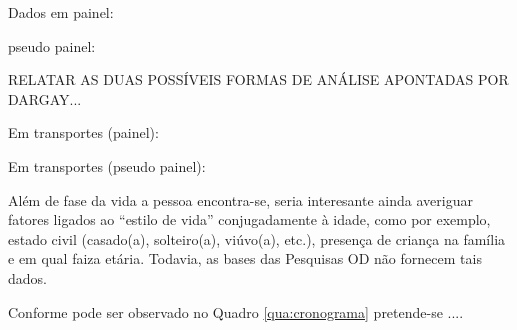 

Dados em painel: \cite{DEATON1985,VERBEEK1992,VERBEEK1992,WOOLDRIDGE2002,FAVERO2013}

pseudo painel: \cite{WARUNSIRI2010,MENG2014,NETTO2014,NETTO2014a}

RELATAR AS DUAS POSSÍVEIS FORMAS DE ANÁLISE APONTADAS POR DARGAY...

Em transportes (painel): \cite{HANSON1985,MOFFITT1993,WIZEMAN2001,LANZENDORF2005,THOGERSEN2006,TRB2006,GLAESER2008,DIANA2010,SENER2011,
SCHEINER2013,COMPTOM2014,DICIOMMO2014,PERCHOUX2014,RASOULI2014}

Em transportes (pseudo painel): \cite{DARGAY1999,DARGAY2002,BRESSON2004}

Além de fase da vida a pessoa encontra-se, seria interesante ainda averiguar fatores ligados ao ``estilo de vida'' conjugadamente à idade, como por exemplo, estado civil (casado(a), solteiro(a), viúvo(a), etc.), presença de criança na família e em qual faiza etária. Todavia, as bases das Pesquisas OD não fornecem tais dados.


Conforme pode ser observado no Quadro \ref{qua:cronograma} pretende-se ....

